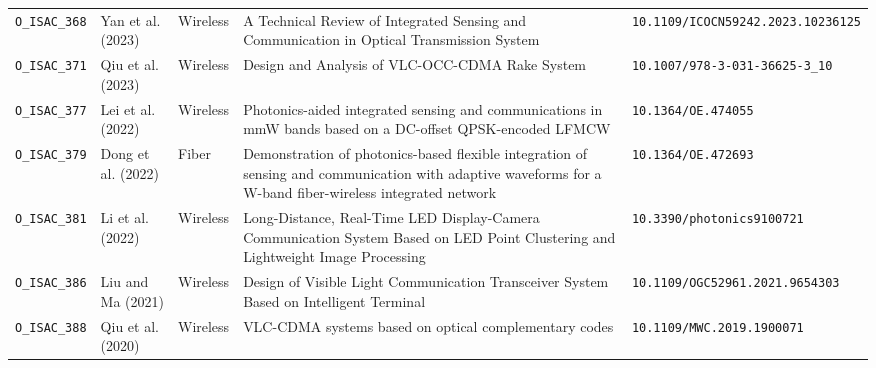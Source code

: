 {\begin{longtable}{L{1.45cm}L{2.45cm}C{1.25cm}L{5.55cm}L{4.15cm}}
\texttt{O\_ISAC\_368} & Yan et al. (2023) & Wireless & A Technical Review of Integrated Sensing and Communication in Optical Transmission System & \nolinkurl{10.1109/ICOCN59242.2023.10236125} \\
\texttt{O\_ISAC\_371} & Qiu et al. (2023) & Wireless & Design and Analysis of VLC-OCC-CDMA Rake System & \nolinkurl{10.1007/978-3-031-36625-3\_10} \\
\texttt{O\_ISAC\_377} & Lei et al. (2022) & Wireless & Photonics-aided integrated sensing and communications in mmW bands based on a DC-offset QPSK-encoded LFMCW & \nolinkurl{10.1364/OE.474055} \\
\texttt{O\_ISAC\_379} & Dong et al. (2022) & Fiber & Demonstration of photonics-based flexible integration of sensing and communication with adaptive waveforms for a W-band fiber-wireless integrated network & \nolinkurl{10.1364/OE.472693} \\
\texttt{O\_ISAC\_381} & Li et al. (2022) & Wireless & Long-Distance, Real-Time LED Display-Camera Communication System Based on LED Point Clustering and Lightweight Image Processing & \nolinkurl{10.3390/photonics9100721} \\
\texttt{O\_ISAC\_386} & Liu and Ma (2021) & Wireless & Design of Visible Light Communication Transceiver System Based on Intelligent Terminal & \nolinkurl{10.1109/OGC52961.2021.9654303} \\
\texttt{O\_ISAC\_388} & Qiu et al. (2020) & Wireless & VLC-CDMA systems based on optical complementary codes & \nolinkurl{10.1109/MWC.2019.1900071} \\
\end{longtable}
}
